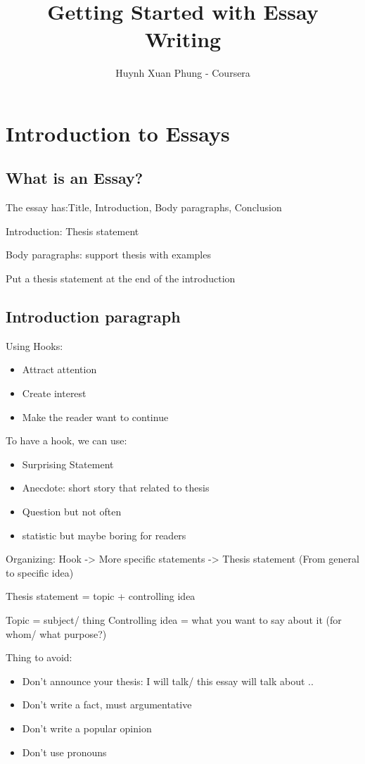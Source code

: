 \documentclass{article}
\title{Getting Started with Essay Writing}
\author{Huynh Xuan Phung - Coursera}
\date{ }
\begin{document}
 
\maketitle
 
\tableofcontents
\section{Introduction to Essays}
\subsection{What is an Essay?}
The essay has:Title, Introduction, Body paragraphs, Conclusion

Introduction: Thesis statement

Body paragraphs: support thesis with examples

Put a thesis statement at the end of the introduction

\subsection{Introduction paragraph} 
Using Hooks:
\begin{itemize}
\item{Attract attention}
\item{Create interest}
\item{Make the reader want to continue}
\end{itemize}
To have a hook, we can use:
\begin{itemize}
\item{Surprising Statement}
\item{Anecdote: short story that related to thesis}
\item{Question but not often}
\item{statistic but maybe boring for readers}
\end{itemize}

Organizing: Hook -> More specific statements -> Thesis statement (From general to specific idea)

Thesis statement = topic + controlling idea

Topic = subject/ thing
Controlling idea = what you want to say about it (for whom/ what purpose?)

Thing to avoid:
\begin{itemize}
\item{Don't announce your thesis: I will talk/ this essay will talk about ..}
\item{Don't write a fact, must argumentative}
\item{Don't write a popular opinion}
\item{Don't use pronouns}
\end{itemize}
\end{document}
